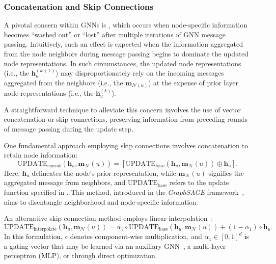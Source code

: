 \subsubsection{Concatenation and Skip Connections} 
A pivotal concern within GNNs is , which occurs when node-specific information becomes “washed out” or “lost” after multiple iterations of GNN message passing. Intuitively, such an effect is expected when the information aggregated from the node neighbors during message passing begins to dominate the updated node representations. In such circumstances, the updated node representations (i.e., the $ \mathbf{h}_u^{(k+1)} $) may disproportionately rely on the incoming messages aggregated from the neighbors (i.e., the $ \mathbf{m}_{\mathcal{N}(u)} $) at the expense of prior layer node representations (i.e., the $ \mathbf{h}_u^{(k)} $).

A straightforward technique to alleviate this concern involves the use of vector concatenation or skip connections, preserving information from preceding rounds of message passing during the update step.

One fundamental approach employing skip connections involves concatenation to retain node information:
\begin{equation*}
\text{UPDATE}_{\text{concat}}(\mathbf{h}_u, \mathbf{m}_\mathcal{N}(u)) = [\text{UPDATE}_{\text{base}}(\mathbf{h}_u, \mathbf{m}_\mathcal{N}(u)) \oplus \mathbf{h}_u].
\end{equation*}
Here, $ \mathbf{h}_u $ delineates the node’s prior representation, while $ \mathbf{m}_\mathcal{N}(u) $ signifies the aggregated message from neighbors, and $ \text{UPDATE}_{\text{base}} $ refers to the update function specified in . This method, introduced in the \textit{GraphSAGE} framework~\cite{Hamilton2017inductiveRepresentationLearning}, aims to disentangle neighborhood and node-specific information.

An alternative skip connection method employs linear interpolation~\cite{Pham2017columnNetworksCollectiveClassification}:
\begin{equation*}
\text{UPDATE}_{\text{interpolate}}(\mathbf{h}_u, \mathbf{m}_\mathcal{N}(u)) = \alpha_1 \circ \text{UPDATE}_{\text{base}}(\mathbf{h}_u, \mathbf{m}_\mathcal{N}(u)) + (1 - \alpha_1) \circ \mathbf{h}_u.
\end{equation*}
In this formulation, $ \circ $ denotes component-wise multiplication, and $ \alpha_1 \in [0,1]^d $ is a gating vector that may be learned via an auxiliary GNN~\cite{Pham2017columnNetworksCollectiveClassification}, a multi-layer perceptron (MLP), or through direct optimization.

